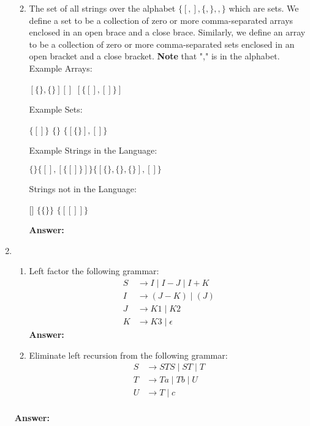 \documentclass[11pt]{article}
\newcommand\tab[1][1cm]{\hspace*{#1}}
\begin{document}
\begin{enumerate}
\begin{enumerate}
  \newpage
    \item The set of all strings over the alphabet $\{[,],\{,\},,\}$ which are sets. We define a set to be a collection of zero or more comma-separated arrays enclosed in an open brace and a close brace. Similarly, we define an array to be a collection of zero or more comma-separated sets enclosed in an open bracket and a close bracket. \textbf{Note} that "," is in the alphabet.\\
    Example Arrays:
    \begin{center}
    $[\{\},\{\}]$\tab $[]$ \tab $[\{[],[]\}]$   
    \end{center}
    Example Sets:
    \begin{center}
    $\{[]\}$ \tab $\{\}$ \tab $\{[\{\}], []\}$  
    \end{center}
    Example Strings in the Language: 
    \begin{center}
    $\{\}$\tab $\{[],[\{[]\}]\}$\tab $\{[\{\}, \{\}, \{\}],[]\}$   
    \end{center}
    Strings not in the Language: 
    \begin{center}
    []  \tab \tab $\{\{\}\}$ \tab \tab $\{[[]]\}$
    \end{center}

    \textbf{Answer:} 
  \end{enumerate}
  
  \newpage
  
  \item \begin{enumerate}
      \item Left factor the following grammar:
        \begin{equation*}
        \begin{split}
          S &\to I \mid I-J \mid I+K  \\
          I &\to (J-K) \mid (J)  \\
          J &\to K1 \mid K2 \\
          K &\to K3 \mid \epsilon 
        \end{split}
      \end{equation*}
    \textbf{Answer:} 
    
    
    \newpage
      \item Eliminate left recursion from the following grammar:
        \begin{equation*}
        \begin{split}
          S &\to STS \mid ST \mid T  \\
          T &\to Ta \mid Tb \mid U\\
          U &\to T \mid c \\
        \end{split}
      \end{equation*}
  \end{enumerate}
  \textbf{Answer:} 
  

\end{enumerate}
\end{document}
